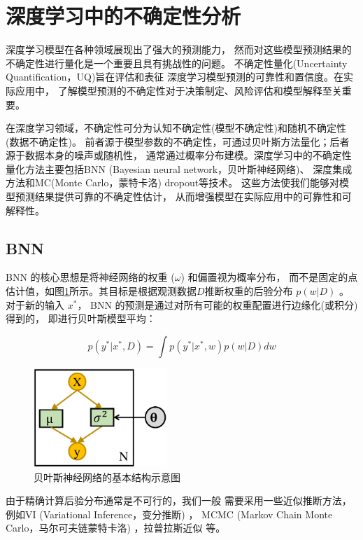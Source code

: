 \section{深度学习中的不确定性分析}\label{uncertainties}
深度学习模型在各种领域展现出了强大的预测能力，
然而对这些模型预测结果的不确定性进行量化是一个重要且具有挑战性的问题。
不确定性量化(Uncertainty Quantification，UQ)旨在评估和表征
深度学习模型预测的可靠性和置信度。在实际应用中，
了解模型预测的不确定性对于决策制定、风险评估和模型解释至关重要。

在深度学习领域，不确定性可分为认知不确定性(模型不确定性)和随机不确定性(数据不确定性)。\cite{ABDAR2021243}
前者源于模型参数的不确定性，可通过贝叶斯方法量化；后者源于数据本身的噪声或随机性，
通常通过概率分布建模。深度学习中的不确定性量化方法主要包括BNN
(Bayesian neural network，贝叶斯神经网络)、
深度集成方法\cite{NIPS2017_9ef2ed4b}和MC(Monte Carlo，蒙特卡洛) dropout等技术。
这些方法使我们能够对模型预测结果提供可靠的不确定性估计，
从而增强模型在实际应用中的可靠性和可解释性。

\subsection{BNN}
BNN 的核心思想是将神经网络的权重 ($\omega$) 和偏置视为概率分布，
而不是固定的点估计值，如图\ref{bnn}所示。其目标是根据观测数据$D$推断权重的后验分布 $p(w|D)$ 。
对于新的输入 $x^*$，
BNN 的预测是通过对所有可能的权重配置进行边缘化(或积分)得到的，
即进行贝叶斯模型平均：\cite{ABDAR2021243}

\begin{equation}
    p(y^*|x^*,D) = \int p(y^*|x^*,w)p(w|D)dw
\end{equation}

\begin{figure}[htbp]
    \centering
    \includegraphics[width=0.45\textwidth]{figures/Bayesianneuralnetwork.pdf}
    \caption{贝叶斯神经网络的基本结构示意图\cite{DBLP:journals/corr/abs-2011-06225}}
    \label{bnn}
\end{figure}
由于精确计算后验分布通常是不可行的，我们一般
需要采用一些近似推断方法，
例如VI (Variational Inference，变分推断) ，
MCMC (Markov Chain Monte Carlo，马尔可夫链蒙特卡洛) ，拉普拉斯近似
等。

